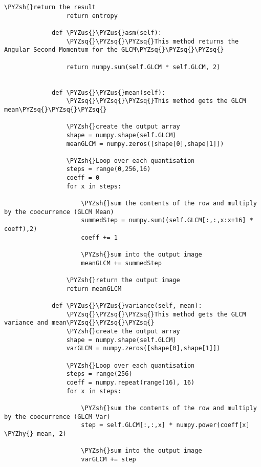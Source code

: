\documentclass[11pt]{article}
\def\PYZsq{\textquotesingle}%
\def\PYZus{\char`\_}
\def\PYZsh{\char`\#}
\def\PYZhy{\char`\-}
\def\PYZsq{\char`\'}
\begin{document}
\begin{Verbatim}[commandchars=\\\{\}]
                 \PYZsh{}return the result
                 return entropy
             
             def \PYZus{}\PYZus{}asm(self):
                 \PYZsq{}\PYZsq{}\PYZsq{}This method returns the Angular Second Momentum for the GLCM\PYZsq{}\PYZsq{}\PYZsq{}
                 
                 return numpy.sum(self.GLCM * self.GLCM, 2)
                 
             
             def \PYZus{}\PYZus{}mean(self):
                 \PYZsq{}\PYZsq{}\PYZsq{}This method gets the GLCM mean\PYZsq{}\PYZsq{}\PYZsq{}
                 
                 \PYZsh{}create the output array
                 shape = numpy.shape(self.GLCM)
                 meanGLCM = numpy.zeros([shape[0],shape[1]])
                
                 \PYZsh{}Loop over each quantisation
                 steps = range(0,256,16)
                 coeff = 0 
                 for x in steps:
                     
                     \PYZsh{}sum the contents of the row and multiply by the coocurrence (GLCM Mean)
                     summedStep = numpy.sum((self.GLCM[:,:,x:x+16] * coeff),2)
                     coeff += 1
                         
                     \PYZsh{}sum into the output image
                     meanGLCM += summedStep
                     
                 \PYZsh{}return the output image  
                 return meanGLCM
             
             def \PYZus{}\PYZus{}variance(self, mean):
                 \PYZsq{}\PYZsq{}\PYZsq{}This method gets the GLCM variance and mean\PYZsq{}\PYZsq{}\PYZsq{}
                 \PYZsh{}create the output array
                 shape = numpy.shape(self.GLCM)
                 varGLCM = numpy.zeros([shape[0],shape[1]])
                       
                 \PYZsh{}Loop over each quantisation
                 steps = range(256)
                 coeff = numpy.repeat(range(16), 16)
                 for x in steps:
                     
                     \PYZsh{}sum the contents of the row and multiply by the coocurrence (GLCM Var)
                     step = self.GLCM[:,:,x] * numpy.power(coeff[x] \PYZhy{} mean, 2)
                         
                     \PYZsh{}sum into the output image
                     varGLCM += step
                     

\end{Verbatim}
\end{document}
